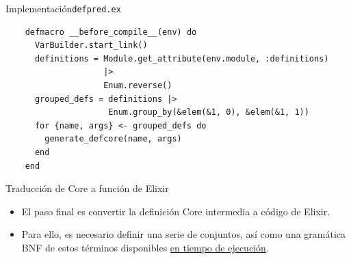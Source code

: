 \documentclass[14pt,aspectratio=169]{beamer}
\begin{document}
\begin{frame}[fragile]{Implementación}{\texttt{defpred.ex}}
  \footnotesize \begin{verbatim}
    defmacro __before_compile__(env) do
      VarBuilder.start_link()
      definitions = Module.get_attribute(env.module, :definitions)
                    |>
                    Enum.reverse()
      grouped_defs = definitions |>
                     Enum.group_by(&elem(&1, 0), &elem(&1, 1))
      for {name, args} <- grouped_defs do
        generate_defcore(name, args)
      end
    end
  \end{verbatim}
\end{frame}

\begin{frame}{Traducción de Core a función de Elixir}
  \begin{itemize}
    \item El paso final es convertir la definición Core intermedia a código de Elixir.
    \item Para ello, es necesario definir una serie de conjuntos, así como una
    gramática BNF de estos términos disponibles \underline{en tiempo de ejecución}.
  \end{itemize}
\end{frame}
\end{document}
